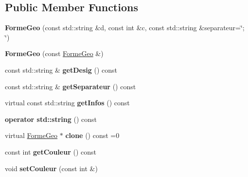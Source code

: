 \subsection*{Public Member Functions}
\begin{DoxyCompactItemize}
\item 
\mbox{\label{class_forme_geo_ab96bd7655720eac2f08614dfdaae8600}} 
{\bfseries Forme\+Geo} (const std\+::string \&d, const int \&c, const std\+::string \&separateur=\char`\"{}; \char`\"{})
\item 
\mbox{\label{class_forme_geo_ac8d849548fd15a811f4e5ae176d4ca77}} 
{\bfseries Forme\+Geo} (const \mbox{\hyperlink{class_forme_geo}{Forme\+Geo}} \&)
\item 
\mbox{\label{class_forme_geo_a9c8a37a9520a9b1d75435c7a5963b9ec}} 
const std\+::string \& {\bfseries get\+Desig} () const
\item 
\mbox{\label{class_forme_geo_a1b9076767bc46ec11cd2cb68425bf851}} 
const std\+::string \& {\bfseries get\+Separateur} () const
\item 
\mbox{\label{class_forme_geo_a8aed0b2af9e373ce60b60c6c183fe440}} 
virtual const std\+::string {\bfseries get\+Infos} () const
\item 
\mbox{\label{class_forme_geo_a325fb628f5ea01a1e42a0415f9862fad}} 
{\bfseries operator std\+::string} () const
\item 
\mbox{\label{class_forme_geo_a985200a977e1c662f831d6889fa96d32}} 
virtual \mbox{\hyperlink{class_forme_geo}{Forme\+Geo}} $\ast$ {\bfseries clone} () const =0
\item 
\mbox{\label{class_forme_geo_a297e7b920aecc59a5927852b5813441a}} 
const int {\bfseries get\+Couleur} () const
\item 
\mbox{\label{class_forme_geo_a13a99d54d251d2d21d45890232f96db8}} 
void {\bfseries set\+Couleur} (const int \&)
\item 
\mbox{\label{class_forme_geo_a77aeb29aba4ea87b70fa2d7970f62291}} 

\end{DoxyCompactItemize}
